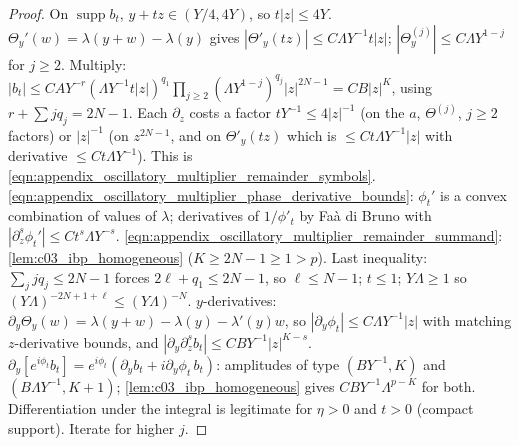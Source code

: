 \begin{proof}
  On $\operatorname{supp}b_t$, $y+tz\in(Y/4,4Y)$, so $t|z|\le4Y$. $\Theta_y'(w)=\lambda(y+w)-\lambda(y)$ gives $|\Theta'_y(tz)|\le C\Lambda Y^{-1}t|z|$; $|\Theta^{(j)}_y|\le C\Lambda Y^{1-j}$ for $j\ge2$. Multiply: $|b_t|\le CAY^{-r}(\Lambda Y^{-1}t|z|)^{q_1}\prod_{j\ge2}(\Lambda Y^{1-j})^{q_j}|z|^{2N-1}=CB|z|^K$, using $r+\sum jq_j=2N-1$.
  Each $\partial_z$ costs a factor $tY^{-1}\le4|z|^{-1}$ (on the $a$, $\Theta^{(j)}$, $j\ge2$ factors) or $|z|^{-1}$ (on $z^{2N-1}$, and on $\Theta'_y(tz)$ which is $\le Ct\Lambda Y^{-1}|z|$ with derivative $\le Ct\Lambda Y^{-1}$). This is \eqref{eqn:appendix_oscillatory_multiplier_remainder_symbols}.
  \eqref{eqn:appendix_oscillatory_multiplier_phase_derivative_bounds}: $\phi_t'$ is a convex combination of values of $\lambda$; derivatives of $1/\phi'_t$ by Fa\`a di Bruno with $|\partial_z^s\phi_t'|\le Ct^{s}\Lambda Y^{-s}$.
  \eqref{eqn:appendix_oscillatory_multiplier_remainder_summand}: \cref{lem:c03_ibp_homogeneous} ($K\ge2N-1\ge1>p$). Last inequality: $\sum_jjq_j\le2N-1$ forces $2\ell+q_1\le2N-1$, so $\ell\le N-1$; $t\le1$; $Y\Lambda\ge1$ so $(Y\Lambda)^{-2N+1+\ell}\le(Y\Lambda)^{-N}$.
  $y$-derivatives: $\partial_y\Theta_y(w)=\lambda(y+w)-\lambda(y)-\lambda'(y)w$, so $|\partial_y\phi_t|\le C\Lambda Y^{-1}|z|$ with matching $z$-derivative bounds, and $|\partial_y\partial_z^sb_t|\le CBY^{-1}|z|^{K-s}$. $\partial_y[e^{i\phi_t}b_t]=e^{i\phi_t}(\partial_yb_t+i\partial_y\phi_t\,b_t)$: amplitudes of type $(BY^{-1},K)$ and $(B\Lambda Y^{-1},K+1)$; \cref{lem:c03_ibp_homogeneous} gives $CBY^{-1}\Lambda^{p-K}$ for both. Differentiation under the integral is legitimate for $\eta>0$ and $t>0$ (compact support). Iterate for higher $j$.
\end{proof}

